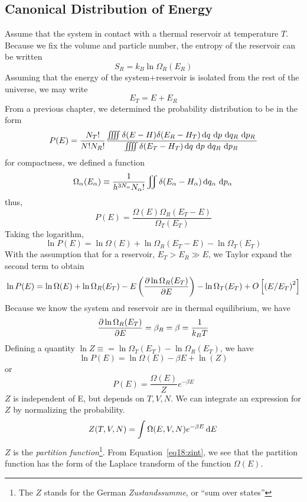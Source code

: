 \subsection{Canonical Distribution of Energy}
Assume that the system in contact with a thermal reservoir at temperature \(T\).  Because we fix the volume and particle number, the entropy of the reservoir can be written
\[S_R = k_B\ln\Omega_R(E_R)\]
Assuming that the energy of the system+reservoir is isolated from the rest of the universe, we may write
\[E_T = E+E_R\]
From a previous chapter, we determined the probability distribution to be in the form
\[P(E) = \frac{N_T!}{N!N_R!}\frac{\iiiint\delta(E-H)\delta(E_R-H_T)\d{q}\d{p}\d{q_R}\d{p_R}}{\iiiint\delta(E_T-H_T)\d{q}\d{p}\d{q_R}\d{p_R}}\]
for compactness, we defined a function
\[\Omega_\alpha(E_\alpha)\equiv\frac{1}{h^{3N_\alpha}N_\alpha!}\iint\delta(E_\alpha-H_\alpha)\d{q_\alpha}\d{p_\alpha}\]
thus,
\[P(E) = \frac{\Omega(E)\Omega_R(E_T-E)}{\Omega_T(E_T)}\]
Taking the logarithm,
\[\ln P(E) = \ln\Omega(E) + \ln\Omega_R(E_T-E) - \ln\Omega_T(E_T)\]
With the assumption that for a reservoir, \(E_T>E_R\gg E\), we Taylor expand the second term to obtain
\[\ln P(E) = \ln\Omega(E)+\ln\Omega_R(E_T) - E\left(\frac{\partial \ln\Omega_R(E_T)}{\partial E}\right)-\ln\Omega_T(E_T)+O\left[\left(E/E_T\right)^2\right]\]
Because we know the system and reservoir are in thermal equilibrium, we have
\[\frac{\partial \ln\Omega_R(E_T)}{\partial E}=\beta_R=\beta=\frac{1}{k_BT}\]
Defining a quantity \(\ln Z\equiv=\ln\Omega_T(E_T)-\ln\Omega_R(E_T)\), we have
\[\ln P(E) = \ln\Omega(E)-\beta E +\ln(Z)\]
or
\begin{equation}
	P(E) = \frac{\Omega(E)}{Z}e^{-\beta E}
\end{equation}
\(Z\) is independent of E, but depends on \(T,V,N\). We can integrate an expression for \(Z\) by normalizing the probability.
\begin{equation}
	Z(T,V,N) = \int\Omega(E,V,N)e^{-\beta E}\d{E}\label{eq18:zint}
\end{equation}
\(Z\) is the \emph{partition function}\footnote{The \(Z\) stands for the German \emph{Zustandssumme}, or ``sum over states''}. From Equation~\ref{eq18:zint}, we see that the partition function has the form of the Laplace transform of the function \(\Omega(E)\).

